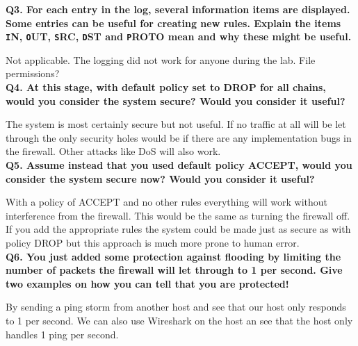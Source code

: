 \noindent \textbf{Q3. For each entry in the log, several information items are
displayed. Some entries can be useful for creating new rules. Explain the 
items {\texttt IN}, {\texttt OUT}, {\texttt SRC}, {\texttt DST} and {\texttt PROTO}
mean and why these might be useful.}
 
Not applicable. The logging did not work for anyone during the lab. File permissions?
\\

\noindent \textbf{Q4. At this stage, with default policy set to DROP for all 
chains, would you consider the system secure? Would you consider it useful?}

The system is most certainly secure but not useful. If no traffic at all will
be let through the only security holes would be if there are any implementation 
bugs in the firewall. Other attacks like DoS will also work. 
\\

\noindent \textbf{Q5. Assume instead that you used default policy ACCEPT, 
would you consider the system secure now? Would you consider it useful?}

With a policy of ACCEPT and no other rules everything will work without interference
from the firewall. This would be the same as turning the firewall off. If you add
the appropriate rules the system could be made just as secure as with policy DROP but
this approach is much more prone to human error.
\\

\noindent \textbf{Q6. You just added some protection against flooding by 
limiting the number of packets the firewall will let through to 1 per second. 
Give two examples on how you can tell that you are protected!}

By sending a ping storm from another host and see that our host only responds to 1 per 
second. We can also use Wireshark on the host an see that the host only handles 1 
ping per second.